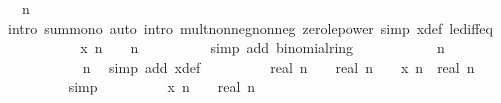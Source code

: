 \begin{isabellebody}
\ {\isacartoucheopen}{}\ {\isacharless}{\kern0pt}\ n{\isacartoucheclose}\isanewline
\ \ \ \ \ \ \ \ \isamarkupfalse%
\ {\isacharparenleft}{\kern0pt}intro\ sum{\isacharunderscore}{\kern0pt}mono{}{\isacharparenright}{\kern0pt}\ {\isacharparenleft}{\kern0pt}auto\ intro{\isacharbang}{\kern0pt}{\isacharcolon}{\kern0pt}\ mult{\isacharunderscore}{\kern0pt}nonneg{\isacharunderscore}{\kern0pt}nonneg\ zero{\isacharunderscore}{\kern0pt}le{\isacharunderscore}{\kern0pt}power\ simp{\isacharcolon}{\kern0pt}\ x{\isacharunderscore}{\kern0pt}def\ le{\isacharunderscore}{\kern0pt}diff{\isacharunderscore}{\kern0pt}eq{\isacharparenright}{\kern0pt}\isanewline
\ \ \ \ \ \ \isamarkupfalse%
\ \isamarkupfalse%
\ {\isachardoublequoteopen}{\isasymdots}\ {\isacharequal}{\kern0pt}\ {\isacharparenleft}{\kern0pt}x\ n\ {\isacharplus}{\kern0pt}\ {}{\isacharparenright}{\kern0pt}\ {\isacharcircum}{\kern0pt}\ n{\isachardoublequoteclose}\isanewline
\ \ \ \ \ \ \ \ \isamarkupfalse%
\ {\isacharparenleft}{\kern0pt}simp\ add{\isacharcolon}{\kern0pt}\ binomial{\isacharunderscore}{\kern0pt}ring{\isacharparenright}{\kern0pt}\isanewline
\ \ \ \ \ \ \isamarkupfalse%
\ \isamarkupfalse%
\ {\isachardoublequoteopen}{\isasymdots}\ {\isacharequal}{\kern0pt}\ n{\isachardoublequoteclose}\isanewline
\ \ \ \ \ \ \ \ \isamarkupfalse%
\ {\isacartoucheopen}{}\ {\isacharless}{\kern0pt}\ n{\isacartoucheclose}\ \isamarkupfalse%
\ {\isacharparenleft}{\kern0pt}simp\ add{\isacharcolon}{\kern0pt}\ x{\isacharunderscore}{\kern0pt}def{\isacharparenright}{\kern0pt}\isanewline
\ \ \ \ \ \ \isamarkupfalse%
\ \isamarkupfalse%
\ {\isachardoublequoteopen}real\ {\isacharparenleft}{\kern0pt}n\ {\isacharminus}{\kern0pt}\ {}{\isacharparenright}{\kern0pt}\ {\isacharasterisk}{\kern0pt}\ {\isacharparenleft}{\kern0pt}real\ n\ {\isacharslash}{\kern0pt}\ {}\ {\isacharasterisk}{\kern0pt}\ {\isacharparenleft}{\kern0pt}x\ n{\isacharparenright}{\kern0pt}\ {\isasymle}\ real\ {\isacharparenleft}{\kern0pt}n\ {\isacharminus}{\kern0pt}\ {}{\isacharparenright}{\kern0pt}\ {\isacharasterisk}{\kern0pt}\ {}{\isachardoublequoteclose}\isanewline
\ \ \ \ \ \ \ \ \isamarkupfalse%
\ simp\isanewline
\ \ \ \ \ \ \isamarkupfalse%
\ \isamarkupfalse%
\ {\isachardoublequoteopen}{\isacharparenleft}{\kern0pt}x\ n{\isacharparenright}{\kern0pt}\ {\isasymle}\ {}\ {\isacharslash}{\kern0pt}\ real\ n{\isachardoublequoteclose}\isanewline

\end{isabellebody}
